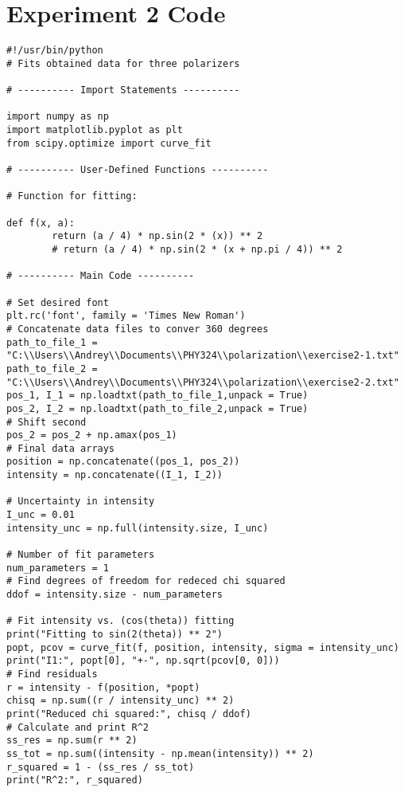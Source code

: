 \section*{Experiment 2 Code}
\begin{lstlisting}
#!/usr/bin/python
# Fits obtained data for three polarizers

# ---------- Import Statements ----------

import numpy as np
import matplotlib.pyplot as plt
from scipy.optimize import curve_fit

# ---------- User-Defined Functions ----------

# Function for fitting:

def f(x, a):
        return (a / 4) * np.sin(2 * (x)) ** 2
        # return (a / 4) * np.sin(2 * (x + np.pi / 4)) ** 2

# ---------- Main Code ----------

# Set desired font
plt.rc('font', family = 'Times New Roman')
# Concatenate data files to conver 360 degrees
path_to_file_1 = "C:\\Users\\Andrey\\Documents\\PHY324\\polarization\\exercise2-1.txt"
path_to_file_2 = "C:\\Users\\Andrey\\Documents\\PHY324\\polarization\\exercise2-2.txt"
pos_1, I_1 = np.loadtxt(path_to_file_1,unpack = True)
pos_2, I_2 = np.loadtxt(path_to_file_2,unpack = True)
# Shift second
pos_2 = pos_2 + np.amax(pos_1)
# Final data arrays
position = np.concatenate((pos_1, pos_2))
intensity = np.concatenate((I_1, I_2))

# Uncertainty in intensity
I_unc = 0.01
intensity_unc = np.full(intensity.size, I_unc)

# Number of fit parameters
num_parameters = 1
# Find degrees of freedom for redeced chi squared
ddof = intensity.size - num_parameters

# Fit intensity vs. (cos(theta)) fitting
print("Fitting to sin(2(theta)) ** 2")
popt, pcov = curve_fit(f, position, intensity, sigma = intensity_unc)
print("I1:", popt[0], "+-", np.sqrt(pcov[0, 0]))
# Find residuals
r = intensity - f(position, *popt)
chisq = np.sum((r / intensity_unc) ** 2)
print("Reduced chi squared:", chisq / ddof)
# Calculate and print R^2
ss_res = np.sum(r ** 2)
ss_tot = np.sum((intensity - np.mean(intensity)) ** 2)
r_squared = 1 - (ss_res / ss_tot)
print("R^2:", r_squared)


\end{lstlisting}
